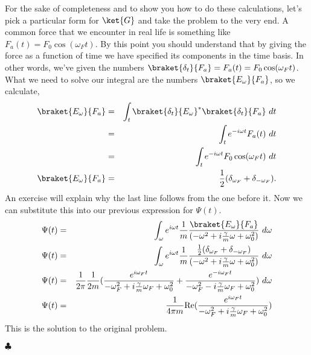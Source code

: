For the sake of completeness and to show you how to do these calculations, let's pick a particular form for $\ket{G}$ and take the problem to the very end.  A common force that we encounter in real life is something like $F_a(t) = F_0\cos(\omega_F t)$.  By this point you should understand that by giving the force as a function of time we have specified its components in the time basis.  In other words, we've given the numbers $\braket{\delta_t}{F_a} = F_a(t) = F_0\cos(\omega_F t)$.  What we need to solve our integral are the numbers $\braket{E_{\omega}}{F_a}$, so we calculate,
\begin{eqnarray*} \braket{E_{\omega}}{F_a} &=& \int _t \braket{\delta_t}{E_{\omega}}^* \braket{\delta_t}{F_a}~dt \\
&=& \int _t e^{-i\omega t} F_a(t)~dt \\
&=& \int _t e^{-i\omega t} F_0 \cos (\omega_F t)~dt \\
\braket{E_{\omega}}{F_a} &=& \frac{1}{2} (\delta_{\omega_F} + \delta_{-\omega_F}). \end{eqnarray*}
An exercise will explain why the last line follows from the one before it.  Now we can substitute this into our previous expression for $\Psi(t)$.
\begin{eqnarray*}
\Psi(t) &=& \int _{\omega} e^{i\omega t} \frac{1}{m}\frac{\braket{E_{\omega}}{F_a}}{(-\omega^2 + i\frac{\gamma}{m}\omega + \omega_0^2)}~d\omega \\
\Psi(t) &=& \int _{\omega} e^{i\omega t} \frac{1}{m}\frac{\frac{1}{2}(\delta_{\omega_F} + \delta_{-\omega_F})}{(-\omega^2 + i\frac{\gamma}{m}\omega + \omega_0^2)}~d\omega \\
\Psi(t) &=& \frac{1}{2\pi}\frac{1}{2m} (\frac{e^{i\omega_Ft}}{-\omega_F^2 + i\frac{\gamma}{m}\omega_F + \omega_0^2} + \frac{e^{-i\omega_Ft}}{-\omega_F^2 - i\frac{\gamma}{m}\omega_F + \omega_0^2})~d\omega \\
\Psi(t) &=& \frac{1}{4\pi m} \textrm{Re} (\frac{e^{i\omega_Ft}}{-\omega_F^2 + i\frac{\gamma}{m}\omega_F + \omega_0^2})
\end{eqnarray*}
This is the solution to the original problem.
\begin{flushright} $\clubsuit$ \end{flushright}